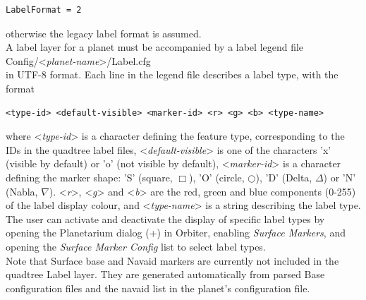 \documentclass[Orbiter Developer Manual.tex]{subfiles}
\begin{document}
\begin{lstlisting}[language=OSFS]
LabelFormat = 2
\end{lstlisting}

\noindent
otherwise the legacy label format is assumed.\\
A label layer for a planet must be accompanied by a label legend file\\
\indent Config/<\textit{planet-name}>/Label.cfg\\
in UTF-8 format. Each line in the legend file describes a label type, with the format

\begin{lstlisting}[language=OSFS]
<type-id> <default-visible> <marker-id> <r> <g> <b> <type-name>
\end{lstlisting}

\noindent
where <\textit{type-id}> is a character defining the feature type, corresponding to the IDs in the quadtree label files, <\textit{default-visible}> is one of the characters 'x' (visible by default) or 'o' (not visible by default), <\textit{marker-id}> is a character defining the marker shape: 'S' (square, $\Box$), 'O' (circle, $\bigcirc$), 'D' (Delta, $\Delta$) or 'N' (Nabla, $\nabla$). <\textit{r}>, <\textit{g}> and <\textit{b}> are the red, green and blue components (0-255) of the label display colour, and <\textit{type-name}> is a string describing the label type.\\
The user can activate and deactivate the display of specific label types by opening the Planetarium dialog (\Ctrl+) in Orbiter, enabling \textit{Surface Markers}, and opening the \textit{Surface Marker Config} list to select label types.\\
Note that Surface base and Navaid markers are currently not included in the quadtree Label layer. They are generated automatically from parsed Base configuration files and the navaid list in the planet's configuration file.
\end{document}
